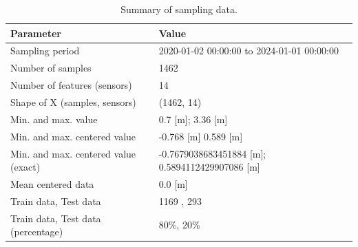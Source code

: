 \begin{table}[htbp]
\centering
\caption{Summary of sampling data.}
\label{dataheij}
\begin{tabular}{|l|l|}
\hline
\textbf{Parameter}                           & \textbf{Value}                                \\ \hline
Sampling period                              & 2020-01-02 00:00:00 to 2024-01-01 00:00:00   \\ \hline
Number of samples                            & 1462                                          \\ \hline
Number of features (sensors)                 & 14                                            \\ \hline
Shape of X (samples, sensors)                & (1462, 14)                                    \\ \hline
Min. and max. value                          & 0.7 [m]; 3.36 [m] \\ \hline
Min. and max. centered value                 & -0.768 [m] 0.589 [m]                         \\ \hline
Min. and max. centered value (exact)         & -0.7679038683451884 [m]; 0.5894112429907086 [m] \\ \hline
Mean centered data                           & 0.0 [m]                                     \\ \hline
Train data, Test data                        & 1169 , 293                                   \\ \hline
Train data, Test data (percentage)           & 80\%, 20\%                                  \\ \hline
\end{tabular}
\end{table} 

